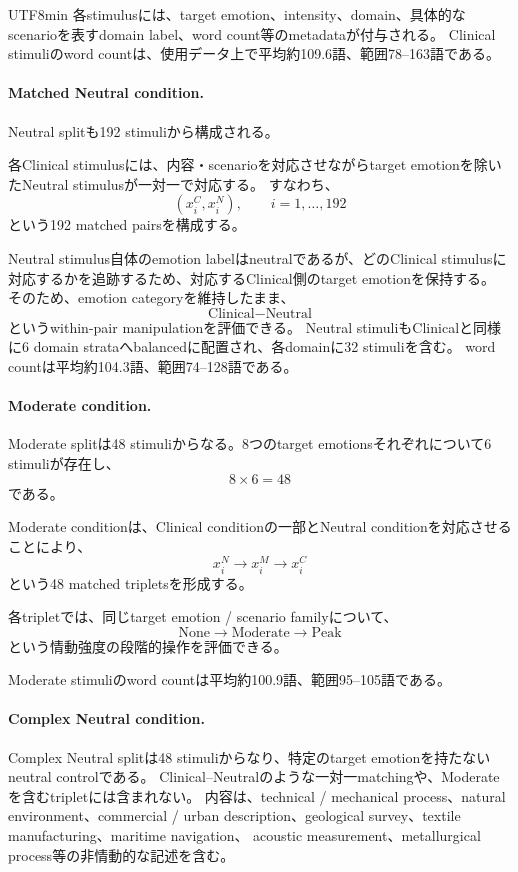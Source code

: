 \documentclass{article} %
\begin{document}
\begin{CJK*}{UTF8}{min}
各stimulusには、target emotion、intensity、domain、具体的なscenarioを表すdomain label、word count等のmetadataが付与される。
Clinical stimuliのword countは、使用データ上で平均約109.6語、範囲78--163語である。

\paragraph{Matched Neutral condition.}

Neutral splitも192 stimuliから構成される。

各Clinical stimulusには、内容・scenarioを対応させながらtarget emotionを除いたNeutral stimulusが一対一で対応する。
すなわち、
\[
(x_i^{C},x_i^{N}),
\qquad
i=1,\ldots,192
\]
という192 matched pairsを構成する。

Neutral stimulus自体のemotion labelはneutralであるが、どのClinical stimulusに対応するかを追跡するため、対応するClinical側のtarget emotionを保持する。
そのため、emotion categoryを維持したまま、
\[
\text{Clinical}
-
\text{Neutral}
\]
というwithin-pair manipulationを評価できる。
Neutral stimuliもClinicalと同様に6 domain strataへbalancedに配置され、各domainに32 stimuliを含む。
word countは平均約104.3語、範囲74--128語である。

\paragraph{Moderate condition.}

Moderate splitは48 stimuliからなる。8つのtarget emotionsそれぞれについて6 stimuliが存在し、
\[
8
\times
6
=
48
\]
である。

Moderate conditionは、Clinical conditionの一部とNeutral conditionを対応させることにより、
\[
x_i^{N}
\rightarrow
x_i^{M}
\rightarrow
x_i^{C}
\]
という48 matched tripletsを形成する。

各tripletでは、同じtarget emotion / scenario familyについて、
\[
\text{None}
\rightarrow
\text{Moderate}
\rightarrow
\text{Peak}
\]
という情動強度の段階的操作を評価できる。

Moderate stimuliのword countは平均約100.9語、範囲95--105語である。

\paragraph{Complex Neutral condition.}

Complex Neutral splitは48 stimuliからなり、特定のtarget emotionを持たないneutral controlである。
Clinical--Neutralのような一対一matchingや、Moderateを含むtripletには含まれない。
内容は、technical / mechanical process、natural environment、commercial / urban description、geological survey、textile manufacturing、maritime navigation、
acoustic measurement、metallurgical process等の非情動的な記述を含む。


\end{CJK*}
\end{document}
